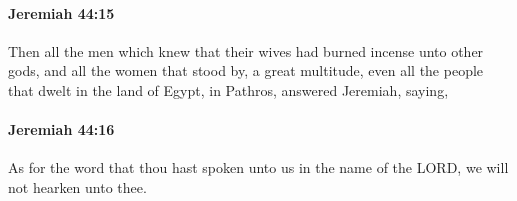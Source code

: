 		\paragraph{Jeremiah 44:15} %
			\label{JEREMIAH-44-15}

			Then all the men which knew that their wives had burned incense unto other gods, and all the women that stood by, a great multitude, even all the people that dwelt in the land of Egypt, in Pathros, answered Jeremiah, saying,


		\paragraph{Jeremiah 44:16} %
			\label{JEREMIAH-44-16}

			As for the word that thou hast spoken unto us in the name of the LORD, we will not hearken unto thee.


